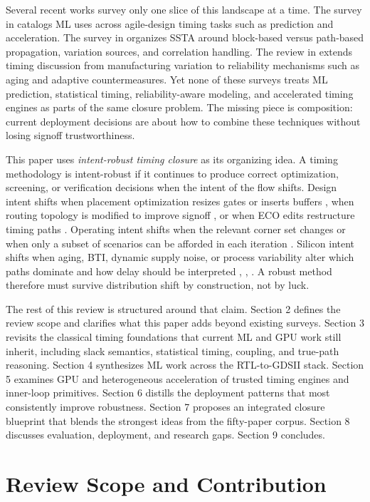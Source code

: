 \documentclass[num-refs]{wiley-article}
\begin{document}
  Several recent works survey only one slice of this landscape at a time. The survey in \cite{ref20} catalogs ML uses across agile-design timing tasks such as prediction and acceleration. The survey in \cite{ref49} organizes SSTA around block-based versus path-based propagation, variation sources, and correlation handling. The review in \cite{ref39} extends timing discussion from manufacturing variation to reliability mechanisms such as aging and adaptive countermeasures. Yet none of these surveys treats ML prediction, statistical timing, reliability-aware modeling, and accelerated timing engines as parts of the same closure problem. The missing piece is composition: current deployment decisions are about how to combine these techniques without losing signoff trustworthiness.


  This paper uses \emph{intent-robust timing closure} as its organizing idea. A timing methodology is intent-robust if it continues to produce correct optimization, screening, or verification decisions when the intent of the flow shifts. Design intent shifts when placement optimization resizes gates or inserts buffers \cite{ref1}, when routing topology is modified to improve signoff \cite{ref7}, or when ECO edits restructure timing paths \cite{ref19}. Operating intent shifts when the relevant corner set changes or when only a subset of scenarios can be afforded in each iteration \cite{ref16}. Silicon intent shifts when aging, BTI, dynamic supply noise, or process variability alter which paths dominate and how delay should be interpreted \cite{ref12}, \cite{ref15}, \cite{ref44}. A robust method therefore must survive distribution shift by construction, not by luck.


  The rest of this review is structured around that claim. Section 2 defines the review scope and clarifies what this paper adds beyond existing surveys. Section 3 revisits the classical timing foundations that current ML and GPU work still inherit, including slack semantics, statistical timing, coupling, and true-path reasoning. Section 4 synthesizes ML work across the RTL-to-GDSII stack. Section 5 examines GPU and heterogeneous acceleration of trusted timing engines and inner-loop primitives. Section 6 distills the deployment patterns that most consistently improve robustness. Section 7 proposes an integrated closure blueprint that blends the strongest ideas from the fifty-paper corpus. Section 8 discusses evaluation, deployment, and research gaps. Section 9 concludes.


  \section{Review Scope and Contribution}
\end{document}
